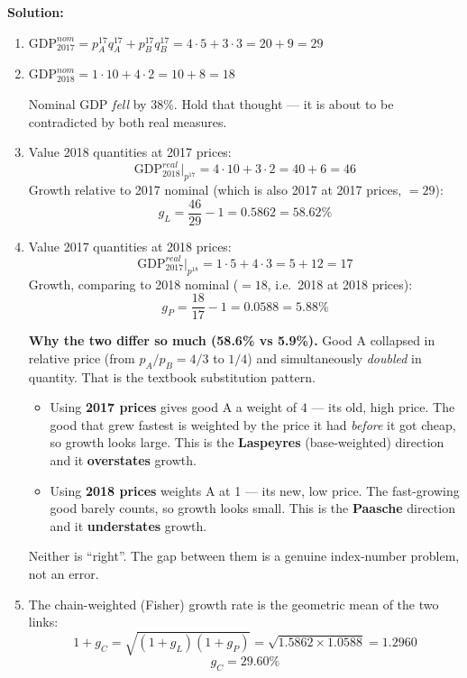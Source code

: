 \documentclass[12pt, letterpaper]{article}
\begin{document}
\begin{tcolorbox}[evenbox,title={Problem 1.2 \quad Comparisons Across Time and Across Countries}]
\textbf{Solution:}

\begin{enumerate}

\item $\text{GDP}^{nom}_{2017} = p_A^{17}q_A^{17} + p_B^{17}q_B^{17}
= 4\cdot 5 + 3\cdot 3 = 20 + 9 = \boxed{29}$ \checkmark

\item $\text{GDP}^{nom}_{2018} = 1\cdot 10 + 4\cdot 2 = 10 + 8 = \boxed{18}$ \checkmark

Nominal GDP \emph{fell} by $38\%$. Hold that thought --- it is about to be contradicted by
both real measures.

\item Value 2018 quantities at 2017 prices:
$$\text{GDP}^{real}_{2018}\big|_{p^{17}} = 4\cdot 10 + 3\cdot 2 = 40 + 6 = \boxed{46}$$
Growth relative to 2017 nominal (which is also 2017 at 2017 prices, $=29$):
$$g_L = \frac{46}{29} - 1 = 0.5862 = \boxed{58.62\%}$$ \checkmark

\item Value 2017 quantities at 2018 prices:
$$\text{GDP}^{real}_{2017}\big|_{p^{18}} = 1\cdot 5 + 4\cdot 3 = 5 + 12 = \boxed{17}$$
Growth, comparing to 2018 nominal ($=18$, i.e.\ 2018 at 2018 prices):
$$g_P = \frac{18}{17} - 1 = 0.0588 = \boxed{5.88\%}$$ \checkmark

\textbf{Why the two differ so much (58.6\% vs 5.9\%).} Good A collapsed in relative price
(from $p_A/p_B = 4/3$ to $1/4$) and simultaneously \emph{doubled} in quantity. That is the
textbook substitution pattern.
\begin{itemize}[leftmargin=1.3em,itemsep=2pt,topsep=2pt]
\item Using \textbf{2017 prices} gives good A a weight of 4 --- its old, high price. The good
      that grew fastest is weighted by the price it had \emph{before} it got cheap, so
      growth looks large. This is the \textbf{Laspeyres} (base-weighted) direction and it
      \textbf{overstates} growth.
\item Using \textbf{2018 prices} weights A at 1 --- its new, low price. The fast-growing good
      barely counts, so growth looks small. This is the \textbf{Paasche} direction and it
      \textbf{understates} growth.
\end{itemize}
Neither is ``right''. The gap between them is a genuine index-number problem, not an error.

\item The chain-weighted (Fisher) growth rate is the geometric mean of the two links:
$$1 + g_C = \sqrt{(1+g_L)(1+g_P)} = \sqrt{1.5862 \times 1.0588} = 1.2960$$
$$g_C = \boxed{29.60\%}$$ \checkmark


\end{enumerate}
\end{tcolorbox}
\end{document}
